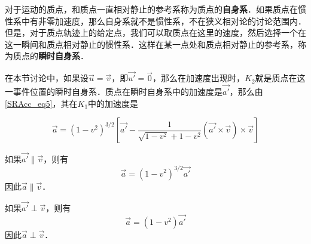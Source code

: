 对于运动的质点，和质点一直相对静止的参考系称为质点的\textbf{自身系}．如果质点在惯性系中有非零加速度，那么自身系就不是惯性系，不在狭义相对论的讨论范围内．但是，对于质点轨迹上的给定点，我们可以取质点在这里的速度，然后选择一个在这一瞬间和质点相对静止的惯性系．这样在某一点处和质点相对静止的参考系，称为质点的\textbf{瞬时自身系}．

在本节讨论中，如果设$\vec{u}=\vec{v}$，即$\vec{u'}=\vec{0}$，那么在加速度出现时，$K_2$就是质点在这一事件位置的瞬时自身系．质点在瞬时自身系中的加速度是$\vec{a'}$，那么由\autoref{SRAcc_eq5}，其在$K_1$中的加速度是

\begin{equation}

\vec{a}=(1-v^2)^{3/2}[\vec{a'}-\frac{1}{\sqrt{1-v^2}+1-v^2}(\vec{a'}\times\vec{v})\times\vec{v}]

\end{equation}

如果$\vec{a'}\parallel \vec{v}$，则有$$\vec{a}=(1-v^2)^{3/2}\vec{a'}$$因此$\vec{a}\parallel\vec{v}$．

如果$\vec{a'}\perp \vec{v}$，则有$$\vec{a}=(1-v^2)\vec{a'}$$因此$\vec{a}\perp\vec{v}$．


